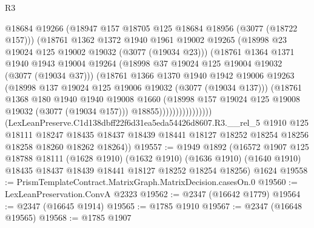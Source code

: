 \begin{lexlean}{R3}
\begin{coremodule}
                              @18684
                              @19266
                              (@18947 @157 @18705 @125 @18684 @18956 (@3077 (@18722 @157)))
                              (@18761
                                @1362
                                @1372
                                @1940
                                @1961
                                @19002
                                @19265
                                (@18998 @23 @19024 @125 @19002 @19032 (@3077 (@19034 @23)))
                                (@18761
                                  @1364
                                  @1371
                                  @1940
                                  @1943
                                  @19004
                                  @19264
                                  (@18998 @37 @19024 @125 @19004 @19032 (@3077 (@19034 @37)))
                                  (@18761
                                    @1366
                                    @1370
                                    @1940
                                    @1942
                                    @19006
                                    @19263
                                    (@18998 @137 @19024 @125 @19006 @19032 (@3077 (@19034 @137)))
                                    (@18761
                                      @1368
                                      @180
                                      @1940
                                      @1940
                                      @19008
                                      @1660
                                      (@18998 @157 @19024 @125 @19008 @19032 (@3077 (@19034 @157)))
                                      @18855))))))))))))))))
      (LexLeanPreserve.C1d138dbff22f6d31ea5eda54426d8607.R3.__rel_5
        @1910
        @125
        @18111
        @18247
        @18435
        @18437
        @18439
        @18441
        @18127
        @18252
        @18254
        @18256
        @18258
        @18260
        @18262
        @18264))
@19557 := @1949
    @1892
    (@16572
      @1907
      @125
      @18788
      @18111
      (@1628 @1910)
      (@1632 @1910)
      (@1636 @1910)
      (@1640 @1910)
      @18435
      @18437
      @18439
      @18441
      @18127
      @18252
      @18254
      @18256)
    @1624
@19558 := PrismTemplateContract.MatrixGraph.MatrixDecision.casesOn.{0}
@19560 := LexLeanPreservation.ConvA @2323
@19562 := @2347 (@16642 @1779)
@19564 := @2347 (@16645 @1914)
@19565 := @1785 @1910
@19567 := @2347 (@16648 @19565)
@19568 := @1785 @1907

\end{coremodule}
\end{lexlean}
